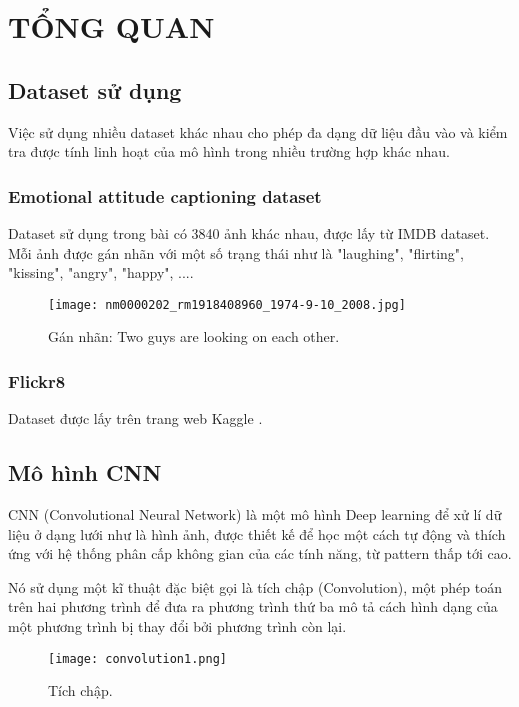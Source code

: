 \chapter{TỔNG QUAN} %

\label{Chapter2} %
\section{Dataset sử dụng}
Việc sử dụng nhiều dataset khác nhau cho phép đa dạng dữ liệu
đầu vào và kiểm tra được tính linh hoạt của mô hình trong nhiều trường hợp khác nhau.
\subsection{Emotional attitude captioning dataset}
Dataset sử dụng trong bài có 3840 ảnh khác nhau, được lấy từ IMDB dataset. Mỗi ảnh được gán nhãn với một số trạng thái như là "laughing", "flirting", "kissing", "angry", "happy", ...\cite{web:4}. 

\begin{figure}[h!]
	\centering
	\texttt{[image: nm0000202\_rm1918408960\_1974-9-10\_2008.jpg]}
	\caption{Gán nhãn: Two guys are looking on each other.}
\end{figure} 
\subsection{Flickr8}
Dataset được lấy trên trang web Kaggle \cite{web:8}.

\section{Mô hình CNN}
CNN (Convolutional Neural Network) là một mô hình Deep learning để xử lí dữ liệu ở dạng lưới như là hình ảnh, được thiết kế để học một cách tự động và thích ứng với hệ thống phân cấp không gian của các tính năng, từ pattern thấp tới cao.\cite{yamashita2018convolutional}

Nó sử dụng một kĩ thuật đặc biệt gọi là tích chập (Convolution), một phép toán trên hai phương trình để đưa ra phương trình thứ ba mô tả cách hình dạng của một phương trình bị thay đổi bởi phương trình còn lại.\cite{web:2}

\begin{figure}[h!]
	\centering
	\texttt{[image: convolution1.png]}
	\caption{Tích chập.}
\end{figure}  

